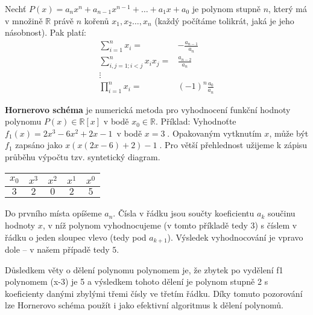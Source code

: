 \begin{veta}
  Nechť $P(x)=a_nx^n+a_{n-1}x^{n-1}+\dots + a_1x+a_0$ je polynom stupně $n$, který má v množině $\mathbb R$ právě $n$ kořenů $x_1,x_2\dots,x_n$ (každý počítáme tolikrát, jaká je jeho násobnost). Pak platí:
  \begin{align*}
    \sum_{i=1}^n x_i = & -\frac{a_{n-1}}{a_n} \\
    \sum_{i,j=1; i<j}^{n}x_ix_j= & \frac{a_{n-2}}{a_n} \\
    \vdots & \\
    \prod_{i=1}^nx_i=&(-1)^n\frac{a_0}{a_n}
  \end{align*}
\end{veta}

\begin{pozn}
  \textbf{Hornerovo schéma} je numerická metoda pro vyhodnocení funkční hodnoty polynomu $P(x) \in \mathbb R [x]$ v bodě $ x_0 \in \mathbb R$. Příklad:
  Vyhodnoťte $f_{1}(x)=2x^{3}-6x^{2}+2x-1\,$ v bodě $x=3\;$.
  Opakovaným vytknutím $x$, může být $f_{1}$ zapsáno jako $x(x(2x-6)+2)-1\;$. Pro větší přehlednost užijeme k zápisu průběhu výpočtu tzv. syntetický diagram.
  \begin{tabular}{ c|c c c c }
    $x_{0}$ & $x^{3}$ & $x^{2}$ & $x^{1}$ & $x^{0}$\\
    \hline
    $3$ & $2$ & $0$ & $2$ & $5$
  \end{tabular}

  Do prvního místa opíšeme $a_n$. Čísla v řádku jsou součty koeficientu $a_k$ součinu hodnoty $x$, v níž polynom vyhodnocujeme (v tomto příkladě tedy $3$) s číslem v řádku o jeden sloupec vlevo (tedy pod $a_{k+1}$). Výsledek vyhodnocování je vpravo dole – v našem případě tedy $5$.

  Důsledkem věty o dělení polynomu polynomem je, že zbytek po vydělení f1 polynomem (x-3) je 5 a výsledkem tohoto dělení je polynom stupně 2 s koeficienty danými zbylými třemi čísly ve třetím řádku. Díky tomuto pozorování lze Hornerovo schéma použít i jako efektivní algoritmus k dělení polynomů.
\end{pozn}

